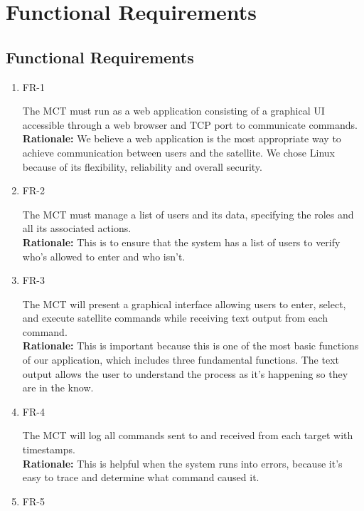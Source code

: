 \documentclass[12pt]{article}
\begin{document}
\section{Functional Requirements}
\subsection{Functional Requirements}
\begin{enumerate}
    \item{FR-1\\}
    
    The MCT must run as a web application consisting of a graphical UI accessible through a web browser and TCP port to communicate commands. \\
    \textbf{Rationale:} We believe a web application is the most appropriate way to achieve communication between users and the satellite. We chose Linux because of its flexibility, reliability and overall security.
    
    \item{FR-2\\}
    
    The MCT must manage a list of users and its data, specifying the roles and all its associated actions. \\
    \textbf{Rationale:} This is to ensure that the system has a list of users to verify who’s allowed to enter and who isn’t. 

    \item{FR-3\\}
    

    The MCT will present a graphical interface allowing users to enter, select, and execute satellite commands while receiving text output from each command. \\
    \textbf{Rationale:} This is important because this is one of the most basic functions of our application, which includes three fundamental functions. The text output allows the user to understand the process as it’s happening so they are in the know. 

    \item{FR-4\\}
    
    The MCT will log all commands sent to and received from each target with timestamps. \\
    \textbf{Rationale:} This is helpful when the system runs into errors, because it’s easy to trace and determine what command caused it. 

    \item{FR-5\\}
    

\end{enumerate}
\end{document}
